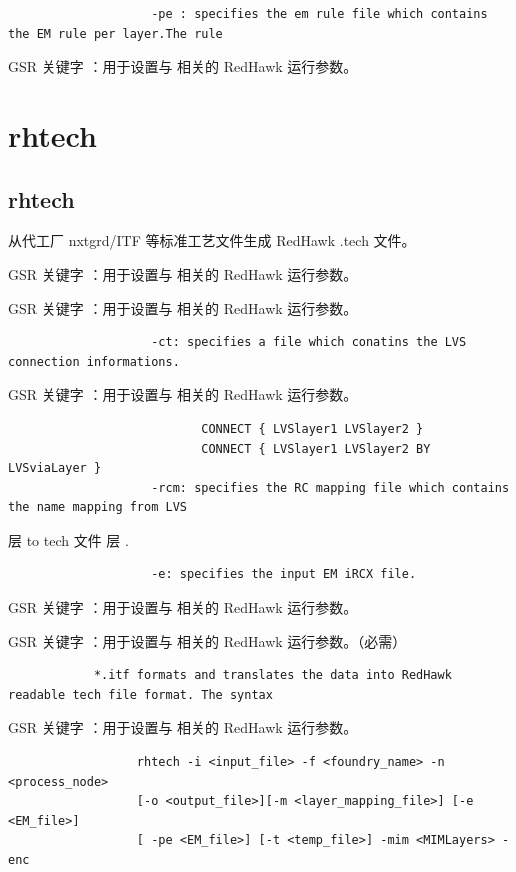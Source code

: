 \begin{lstlisting}
                    -pe : specifies the em rule file which contains the EM rule per layer.The rule
\end{lstlisting}

GSR 关键字 ：用于设置与  相关的 RedHawk 运行参数。

\section{rhtech}
\subsection*{rhtech}

从代工厂 nxtgrd/ITF 等标准工艺文件生成 RedHawk .tech 文件。

GSR 关键字 ：用于设置与  相关的 RedHawk 运行参数。

GSR 关键字 ：用于设置与  相关的 RedHawk 运行参数。

\begin{lstlisting}
                    -ct: specifies a file which conatins the LVS connection informations.
\end{lstlisting}

GSR 关键字 ：用于设置与  相关的 RedHawk 运行参数。

\begin{lstlisting}
                           CONNECT { LVSlayer1 LVSlayer2 }
                           CONNECT { LVSlayer1 LVSlayer2 BY LVSviaLayer }
                    -rcm: specifies the RC mapping file which contains the name mapping from LVS
\end{lstlisting}

层 to tech 文件 层 .

\begin{lstlisting}
                    -e: specifies the input EM iRCX file.
\end{lstlisting}

GSR 关键字 ：用于设置与  相关的 RedHawk 运行参数。

GSR 关键字 ：用于设置与  相关的 RedHawk 运行参数。（必需）

\begin{lstlisting}
            *.itf formats and translates the data into RedHawk readable tech file format. The syntax
\end{lstlisting}

GSR 关键字 ：用于设置与  相关的 RedHawk 运行参数。

\begin{lstlisting}
                  rhtech -i <input_file> -f <foundry_name> -n <process_node>
                  [-o <output_file>][-m <layer_mapping_file>] [-e <EM_file>]
                  [ -pe <EM_file>] [-t <temp_file>] -mim <MIMLayers> -enc
\end{lstlisting}

